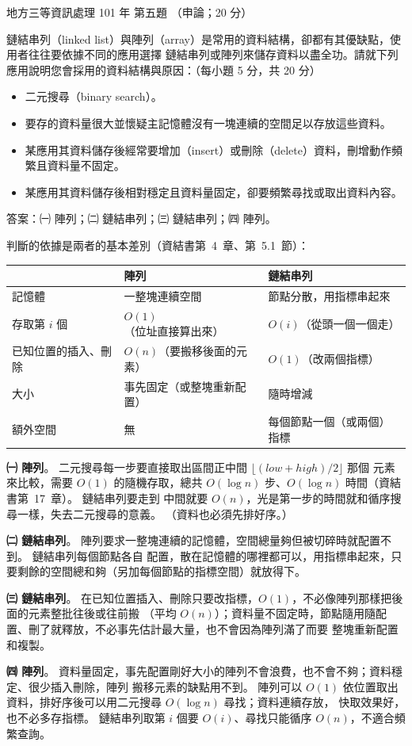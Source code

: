 \begin{pastexam}[label={px:df3-101-ds-05}]{地方三等資訊處理 101 年 第五題}
（申論；20 分）

鏈結串列（linked list）與陣列（array）是常用的資料結構，卻都有其優缺點，使用者往往要依據不同的應用選擇
鏈結串列或陣列來儲存資料以盡全功。請就下列應用說明您會採用的資料結構與原因：（每小題 5 分，共 20 分）
\begin{itemize}[leftmargin=2.2em]
\item[㈠] 二元搜尋（binary search）。
\item[㈡] 要存的資料量很大並懷疑主記憶體沒有一塊連續的空間足以存放這些資料。
\item[㈢] 某應用其資料儲存後經常要增加（insert）或刪除（delete）資料，刪增動作頻繁且資料量不固定。
\item[㈣] 某應用其資料儲存後相對穩定且資料量固定，卻要頻繁尋找或取出資料內容。
\end{itemize}
\end{pastexam}

\begin{pastsoln}
答案：㈠ 陣列；㈡ 鏈結串列；㈢ 鏈結串列；㈣ 陣列。

判斷的依據是兩者的基本差別（資結書第~4~章、第~5.1~節）：
\begin{center}
\small
\begin{tabular}{lll}
\toprule
 & 陣列 & 鏈結串列 \\
\midrule
記憶體 & 一整塊連續空間 & 節點分散，用指標串起來 \\
存取第 $i$ 個 & $O(1)$（位址直接算出來） & $O(i)$（從頭一個一個走） \\
已知位置的插入、刪除 & $O(n)$（要搬移後面的元素） & $O(1)$（改兩個指標） \\
大小 & 事先固定（或整塊重新配置） & 隨時增減 \\
額外空間 & 無 & 每個節點一個（或兩個）指標 \\
\bottomrule
\end{tabular}
\end{center}

\textbf{㈠ 陣列}。 二元搜尋每一步要直接取出區間正中間 $\lfloor (\mathit{low} + \mathit{high})/2 \rfloor$ 那個
元素來比較，需要 $O(1)$ 的隨機存取，總共 $O(\log n)$ 步、$O(\log n)$ 時間（資結書第~17~章）。 鏈結串列要走到
中間就要 $O(n)$，光是第一步的時間就和循序搜尋一樣，失去二元搜尋的意義。 （資料也必須先排好序。）

\textbf{㈡ 鏈結串列}。 陣列要求一整塊連續的記憶體，空間總量夠但被切碎時就配置不到。 鏈結串列每個節點各自
配置，散在記憶體的哪裡都可以，用指標串起來，只要剩餘的空間總和夠（另加每個節點的指標空間）就放得下。

\textbf{㈢ 鏈結串列}。 在已知位置插入、刪除只要改指標，$O(1)$，不必像陣列那樣把後面的元素整批往後或往前搬
（平均 $O(n)$）；資料量不固定時，節點隨用隨配置、刪了就釋放，不必事先估計最大量，也不會因為陣列滿了而要
整塊重新配置和複製。

\textbf{㈣ 陣列}。 資料量固定，事先配置剛好大小的陣列不會浪費，也不會不夠；資料穩定、很少插入刪除，陣列
搬移元素的缺點用不到。 陣列可以 $O(1)$ 依位置取出資料，排好序後可以用二元搜尋 $O(\log n)$ 尋找；資料連續存放，
快取效果好，也不必多存指標。 鏈結串列取第 $i$ 個要 $O(i)$、尋找只能循序 $O(n)$，不適合頻繁查詢。
\end{pastsoln}
